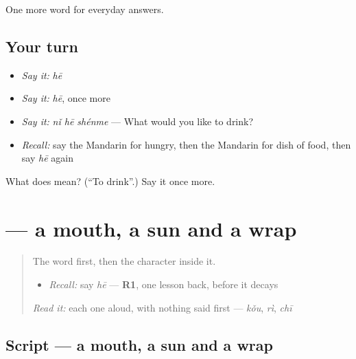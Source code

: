 \begin{grammarlens}[title={What you've built}]
One more word for everyday answers.
\end{grammarlens}

\subsection*{Your turn}
\begin{itemize}
\raggedright
  \item \emph{Say it:} \emph{hē}
  \item \emph{Say it:} \emph{hē}, once more
  \item \emph{Say it:} \emph{nǐ hē shénme} — What would you like to drink?
  \item \emph{Recall:} say the Mandarin for hungry, then the Mandarin for dish of food, then say \emph{hē} again
\end{itemize}

\begin{tcolorbox}[breakable,colback=teal!4,colframe=teal!35!black,title={Before you move on}]
What does  mean? (\textquotedblleft{}To drink\textquotedblright{}.) Say it once more.
\end{tcolorbox}
\section[\texorpdfstring{\zh{喝} (hē)}{喝 (hē)}]{ — a mouth, a sun and a wrap}

\label{lesson:ZH-W39-he-drink}



\begin{quote}
The word first, then the character inside it.

\begin{itemize}
\raggedright
  \item \emph{Recall:} say \emph{hē} — \textbf{R1}, one lesson back, before it decays
\end{itemize}

\begin{quote}
  
\end{quote}

\emph{Read it:} each one aloud, with nothing said first — \emph{kǒu}, \emph{rì}, \emph{chī}
\end{quote}

\subsection*{Script — a mouth, a sun and a wrap}

